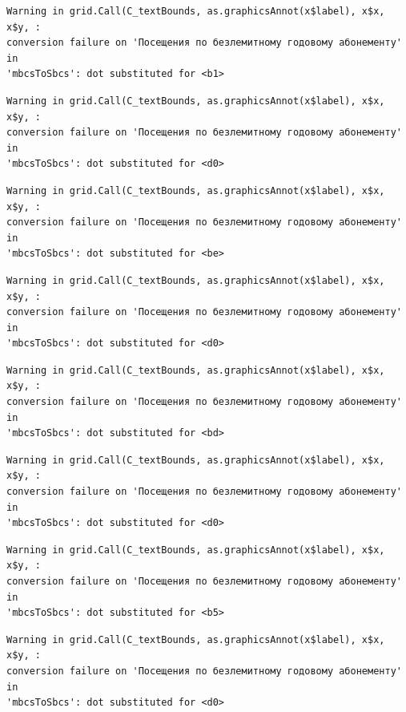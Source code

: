 \documentclass[
  letterpaper,
  DIV=11,
  numbers=noendperiod]{scrartcl}
\begin{document}
\begin{verbatim}
Warning in grid.Call(C_textBounds, as.graphicsAnnot(x$label), x$x, x$y, :
conversion failure on 'Посещения по безлемитному годовому абонементу' in
'mbcsToSbcs': dot substituted for <b1>
\end{verbatim}

\begin{verbatim}
Warning in grid.Call(C_textBounds, as.graphicsAnnot(x$label), x$x, x$y, :
conversion failure on 'Посещения по безлемитному годовому абонементу' in
'mbcsToSbcs': dot substituted for <d0>
\end{verbatim}

\begin{verbatim}
Warning in grid.Call(C_textBounds, as.graphicsAnnot(x$label), x$x, x$y, :
conversion failure on 'Посещения по безлемитному годовому абонементу' in
'mbcsToSbcs': dot substituted for <be>
\end{verbatim}

\begin{verbatim}
Warning in grid.Call(C_textBounds, as.graphicsAnnot(x$label), x$x, x$y, :
conversion failure on 'Посещения по безлемитному годовому абонементу' in
'mbcsToSbcs': dot substituted for <d0>
\end{verbatim}

\begin{verbatim}
Warning in grid.Call(C_textBounds, as.graphicsAnnot(x$label), x$x, x$y, :
conversion failure on 'Посещения по безлемитному годовому абонементу' in
'mbcsToSbcs': dot substituted for <bd>
\end{verbatim}

\begin{verbatim}
Warning in grid.Call(C_textBounds, as.graphicsAnnot(x$label), x$x, x$y, :
conversion failure on 'Посещения по безлемитному годовому абонементу' in
'mbcsToSbcs': dot substituted for <d0>
\end{verbatim}

\begin{verbatim}
Warning in grid.Call(C_textBounds, as.graphicsAnnot(x$label), x$x, x$y, :
conversion failure on 'Посещения по безлемитному годовому абонементу' in
'mbcsToSbcs': dot substituted for <b5>
\end{verbatim}

\begin{verbatim}
Warning in grid.Call(C_textBounds, as.graphicsAnnot(x$label), x$x, x$y, :
conversion failure on 'Посещения по безлемитному годовому абонементу' in
'mbcsToSbcs': dot substituted for <d0>
\end{verbatim}
\end{document}
